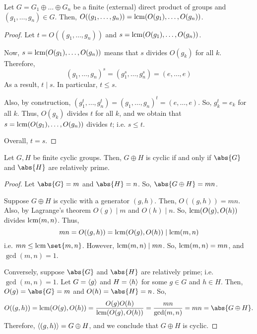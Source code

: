 \documentclass[11pt]{penrose}
\begin{document}
\begin{nthm}
    Let $G = G_{1} \oplus \dots \oplus G_{n}$ be a finite (external) direct product of groups and $(g_{1}, \dots, g_{n}) \in G$. Then, $O( (g_{1}, \dots, g_{n}) ) = \operatorname{lcm}( O(g_{1}), \dots, O(g_{n}) )$.
\end{nthm}
\begin{proof}
    Let $t = O( (g_{1}, \dots, g_{n}) )$ and $s = \operatorname{lcm}( O(g_{1}), \dots, O(g_{n}) )$.

    Now, $s = \operatorname{lcm}( O(g_{1}), \dots, O(g_{n}) )$ means that $s$ divides $O(g_{k})$ for all $k$. Therefore,
    \begin{equation*}
        (g_{1}, \dots, g_{n})^{s} = (g_{1}^{s}, \dots, g_{n}^{s}) = (e, \dots, e)
    \end{equation*}
    As a result, $t \mid s$. In particular, $t \leq s$.

    Also, by construction, $(g_{1}^{t}, \dots, g_{n}^{t}) = (g_{1}, \dots, g_{n})^{t} = (e, \dots, e)$. So, $g_{k}^{t} = e_{k}$ for all $k$. Thus, $O(g_{k})$ divides $t$ for all $k$, and we obtain that $s = \operatorname{lcm}( O(g_{1}), \dots, O(g_{n}) )$ divides $t$; i.e. $s \leq t$.

    Overall, $t = s$.
\end{proof}

\begin{nthm}
    Let $G, H$ be finite cyclic groups. Then, $G \oplus H$ is cyclic if and only if $\abs{G}$ and $\abs{H}$ are relatively prime.
\end{nthm}
\begin{proof}
    Let $\abs{G} = m$ and $\abs{H} = n$. So, $\abs{G \oplus H} = mn$.

    Suppose $G \oplus H$ is cyclic with a generator $(g,h)$. Then, $O((g,h)) = mn$. Also, by Lagrange's theorem $O(g) \mid m$ and $O(h) \mid n$. So, $\operatorname{lcm}(O(g), O(h))$ divides $\operatorname{lcm}(m,n)$. Thus,
    \begin{equation*}
        mn = O((g,h)) = \operatorname{lcm}(O(g), O(h)) \mid \operatorname{lcm}(m,n)
    \end{equation*}
    i.e. $mn \leq \lcm\set{m,n}$. However, $\operatorname{lcm}(m,n) \mid mn$. So, $\operatorname{lcm}(m,n) = mn$, and $\gcd(m,n) = 1$.

    Conversely, suppose $\abs{G}$ and $\abs{H}$ are relatively prime; i.e. $\gcd(m,n) = 1$. Let $G = \langle g\rangle$ and $H = \langle h\rangle$ for some $g \in G$ and $h \in H$. Then, $O(g) = \abs{G} = m$ and $O(h) = \abs{H} = n$. So,
    \begin{equation*}
        O( (g,h) )
        = \lcm(O(g), O(h))
        = \frac{O(g)O(h)}{\lcm(O(g), O(h))}
        = \frac{mn}{\gcd(m,n)}
        = mn
        = \abs{G \oplus H}.
    \end{equation*}
    Therefore, $\langle(g,h)\rangle = G \oplus H$, and we conclude that $G \oplus H$ is cyclic.
\end{proof}
\end{document}
